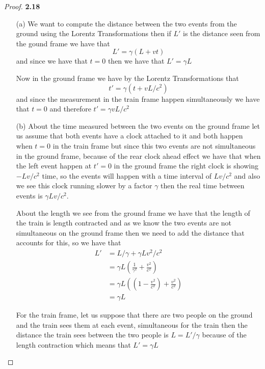 \documentclass[11pt]{article}
\theoremstyle{definition}
\begin{document}
	\begin{proof}{\textbf{2.18}}
        \begin{itemize}
            \item[(a)]
            We want to compute the distance between the two events from the ground
            using the Lorentz Transformations then if $L'$ is the distance seen from the
            gound frame we have that
            $$L' = \gamma(L + vt)$$
            and since we have that $t = 0$ then we have that $L'= \gamma L$

            Now in the ground frame we have by the Lorentz Transformations that 
            $$t' = \gamma (t + vL/c^2)$$
            and since the measurement in the train frame happen simultaneously we have
            that $t = 0$ and therefore $t' = \gamma vL/c^2$
            \item [(b)]
            About the time measured between the two events on the ground frame
            let us assume that both events have a clock attached to it and both 
            happen when $t=0$ in the train frame but
            since this two events are not simultaneous in the ground frame, because of
            the rear clock ahead effect we have that when the left event happen at
            $t' = 0$ in the ground frame the right clock is showing $-Lv/c^2$ time,
            so the events will happen with a time interval of $Lv/c^2$ and also we see
            this clock running slower by a factor $\gamma$ then the real time between
            events is $\gamma Lv/c^2$.

            About the length we see from the ground frame we have that the length of the
            train is length contracted and as we know the two events are not
            simultaneous on the ground frame then we need to add the distance that
            accounts for this, so we have that
            \begin{align*}
                L' &= L/\gamma + \gamma Lv^2/c^2\\
                    &= \gamma L (\frac{1}{\gamma^2} + \frac{v^2}{c^2})\\
                    &= \gamma L ((1 - \frac{v^2}{c^2}) + \frac{v^2}{c^2})\\
                    &= \gamma L
            \end{align*}
            
            For the train frame, let us suppose that there are two people on the ground
            and the train sees them at each event, simultaneous for the train then
            the distance the train sees between the two people is $L = L' / \gamma$
            because of the length contraction which means that $L' = \gamma L$


\end{itemize}
\end{proof}
\end{document}
